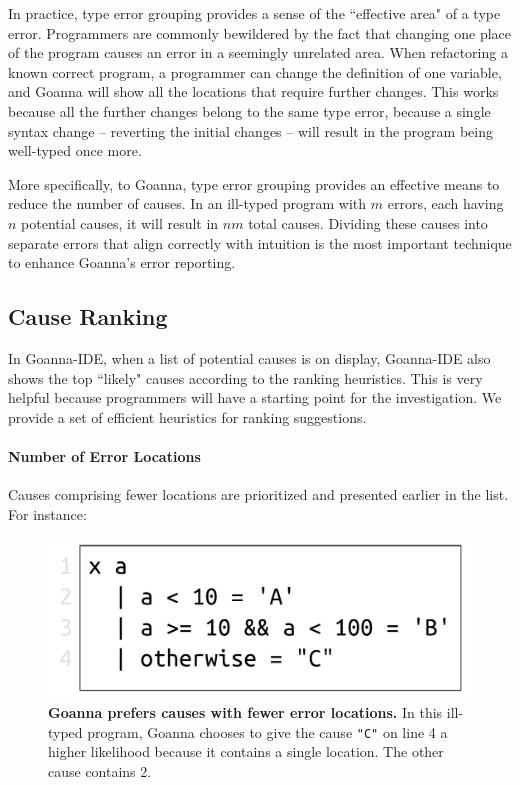 \documentclass[pdflatex,lineno,sn-nature,Numbered]{sn-jnl}%
\begin{document}
	In practice, type error grouping provides a sense of the ``effective area" of a type error. Programmers are commonly bewildered by the fact that changing one place of the program causes an error in a seemingly unrelated area. When refactoring a known correct program, a programmer can change the definition of one variable, and Goanna will show all the locations that require further changes. This works because all the further changes belong to the same type error, because a single syntax change -- reverting the initial changes -- will result in the program being well-typed once more.
	
	More specifically, to Goanna, type error grouping provides an effective means to reduce the number of causes. In an ill-typed program with $m$ errors, each having $n$ potential causes, it will result in $nm$ total causes. Dividing these causes into separate errors that align correctly with intuition is the most important technique to enhance Goanna's error reporting.

    \subsection{Cause Ranking} \label{sub:ranking}
     In Goanna-IDE, when a list of potential causes is on display, Goanna-IDE also shows the top ``likely" causes according to the ranking heuristics. This is very helpful because programmers will have a starting point for the investigation. We provide a set of efficient heuristics for ranking suggestions. 

    \paragraph{Number of Error Locations}
    Causes comprising fewer locations are prioritized and presented earlier in the list. For instance:
   \begin{figure}[ht!]
        \centering
        \includegraphics[width=0.5\linewidth]{images/Loc-Count}
        \caption[Goanna prefers causes with fewer error locations]{\textbf{Goanna prefers causes with fewer error locations.} In this ill-typed program, Goanna chooses to give the cause \texttt{"C"} on line 4 a higher likelihood because it contains a single location. The other cause contains 2. }
        \label{fig:loc-count}
    \end{figure}
\end{document}
